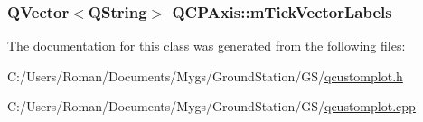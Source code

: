 \subsubsection[{m\+Tick\+Vector\+Labels}]{\setlength{\rightskip}{0pt plus 5cm}Q\+Vector$<$Q\+String$>$ Q\+C\+P\+Axis\+::m\+Tick\+Vector\+Labels\hspace{0.3cm}{\ttfamily [protected]}}\label{class_q_c_p_axis_aeee4bd0fca3f587eafe33843d1cb4f82}


The documentation for this class was generated from the following files\+:\begin{DoxyCompactItemize}
\item 
C\+:/\+Users/\+Roman/\+Documents/\+Mygs/\+Ground\+Station/\+G\+S/\hyperlink{qcustomplot_8h}{qcustomplot.\+h}\item 
C\+:/\+Users/\+Roman/\+Documents/\+Mygs/\+Ground\+Station/\+G\+S/\hyperlink{qcustomplot_8cpp}{qcustomplot.\+cpp}\end{DoxyCompactItemize}

